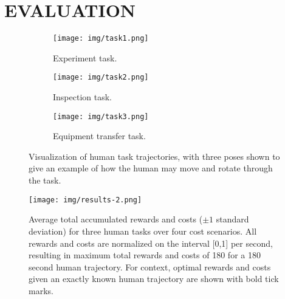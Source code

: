 \documentclass[letterpaper, 10 pt, conference]{ieeeconf}  %
\begin{document}
\section{EVALUATION}
\label{sec:results}

\begin{figure}
\centering
\begin{subfigure}{.44\textwidth}
	\centering
	\texttt{[image: img/task1.png]}
	\vspace{-.5cm}
	\caption{Experiment task.}
	\label{fig:experiment}
\end{subfigure}
\par\medskip
\begin{subfigure}{.44\textwidth}
	\centering
	\texttt{[image: img/task2.png]}
	\vspace{-.5cm}
	\caption{Inspection task.}
	\label{fig:inspection}
\end{subfigure}
\par\medskip
\begin{subfigure}{.44\textwidth}
	\centering
	\texttt{[image: img/task3.png]}
	\vspace{-.5cm}
	\caption{Equipment transfer task.}
	\vspace{-.1cm}
	\label{fig:transfer}
\end{subfigure}
\caption{Visualization of human task trajectories, with three poses shown to give an example of how the human may move and rotate through the task.}
\label{fig:trajectories}
\vspace{-0.2cm}
\end{figure}

\begin{figure*}[t]
\centering
\texttt{[image: img/results-2.png]}
\caption{Average total accumulated rewards and costs ($\pm 1$ standard deviation) for three human tasks over four cost scenarios.  All rewards and costs are normalized on the interval [0,1] per second, resulting in maximum total rewards and costs of 180 for a 180 second human trajectory.  For context, optimal rewards and costs given an exactly known human trajectory are shown with bold tick marks.}
\label{fig:results}
\vspace{-0.5cm}
\end{figure*}
\end{document}
